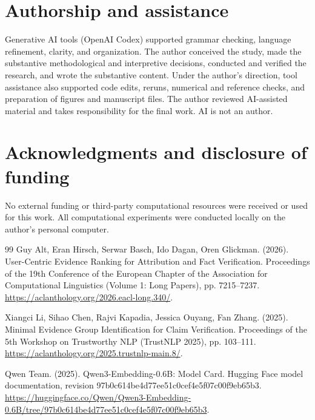 \documentclass[twoside,a4paper,11pt]{article}
\begin{document}
\section{Authorship and assistance}
Generative AI tools (OpenAI Codex) supported grammar checking, language refinement, clarity, and organization. The author conceived the study, made the substantive methodological and interpretive decisions, conducted and verified the research, and wrote the substantive content. Under the author's direction, tool assistance also supported code edits, reruns, numerical and reference checks, and preparation of figures and manuscript files. The author reviewed AI-assisted material and takes responsibility for the final work. AI is not an author.


\section{Acknowledgments and disclosure of funding}
No external funding or third-party computational resources were received or used for this work. All computational experiments were conducted locally on the author's personal computer.

\clearpage\begin{thebibliography}{99}
Guy Alt, Eran Hirsch, Serwar Basch, Ido Dagan, Oren Glickman. (2026). User-Centric Evidence Ranking for Attribution and Fact Verification. Proceedings of the 19th Conference of the European Chapter of the Association for Computational Linguistics (Volume 1: Long Papers), pp. 7215--7237. \url{https://aclanthology.org/2026.eacl-long.340/}.

Xiangci Li, Sihao Chen, Rajvi Kapadia, Jessica Ouyang, Fan Zhang. (2025). Minimal Evidence Group Identification for Claim Verification. Proceedings of the 5th Workshop on Trustworthy NLP (TrustNLP 2025), pp. 103--111. \url{https://aclanthology.org/2025.trustnlp-main.8/}.

Qwen Team. (2025). Qwen3-Embedding-0.6B: Model Card. Hugging Face model documentation, revision 97b0c614be4d77ee51c0cef4e5f07c00f9eb65b3. \url{https://huggingface.co/Qwen/Qwen3-Embedding-0.6B/tree/97b0c614be4d77ee51c0cef4e5f07c00f9eb65b3}.

\end{thebibliography}
\end{document}
